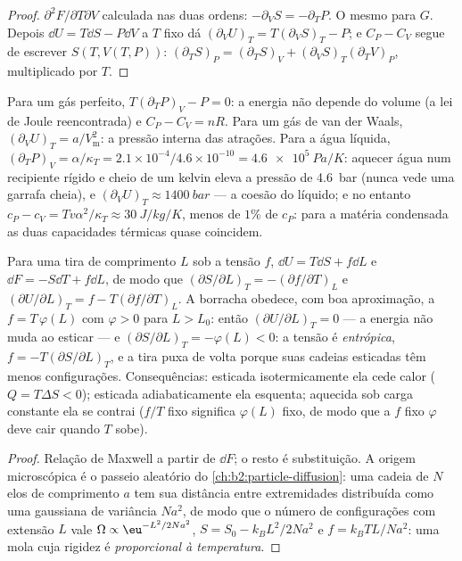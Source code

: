 \begin{proof}
$\partial^2F/\partial T\partial V$ calculada nas duas ordens: $-\partial_VS =
-\partial_TP$. O mesmo para $G$. Depois $\dd U = T\dd S - P\dd V$ a $T$ fixo
dá $(\partial_VU)_T = T(\partial_VS)_T - P$; e $C_P - C_V$ segue
de escrever $S(T,V(T,P))$: $(\partial_TS)_P = (\partial_TS)_V +
(\partial_VS)_T(\partial_TV)_P$, multiplicado por $T$.
\end{proof}

\begin{example}\label{ex:b2:thermodynamic-potentials:reveal}
Para um gás perfeito, $T(\partial_TP)_V - P = 0$: a energia não depende
do volume (a lei de Joule reencontrada) e $C_P - C_V = nR$. Para um gás de van
der Waals, $(\partial_VU)_T = a/V_{\text{m}}^2$: a pressão interna das
atrações. Para a água líquida, $(\partial_TP)_V = \alpha/\kappa_T = 2.1
\times 10^{-4}/4.6 \times 10^{-10} = \qty{4.6e5}{Pa/K}$: aquecer água num
recipiente rígido e cheio de um kelvin eleva a pressão de \qty{4.6}{bar}
(nunca vede uma garrafa cheia), e $(\partial_VU)_T \approx \qty{1400}{bar}$ ---
a coesão do líquido; e no entanto $c_P - c_V = Tv\alpha^2/\kappa_T \approx
\qty{30}{J/kg/K}$, menos de $1\%$ de $c_P$: para a matéria condensada as duas
capacidades térmicas quase coincidem.
\end{example}

\begin{proposition}\label{prop:b2:thermodynamic-potentials:rubber}
Para uma tira de comprimento $L$ sob a tensão $f$, $\dd U = T\dd S + f\dd L$
e $\dd F = -S\dd T + f\dd L$, de modo que $(\partial S/\partial L)_T =
-(\partial f/\partial T)_L$ e $(\partial U/\partial L)_T = f - T(\partial f/
\partial T)_L$. A borracha obedece, com boa aproximação, a $f = T\,\varphi(L)$
com $\varphi > 0$ para $L > L_0$: então $(\partial U/\partial L)_T = 0$ --- a
energia não muda ao esticar --- e $(\partial S/\partial L)_T =
-\varphi(L) < 0$: a tensão é \emph{entrópica}, $f = -T(\partial S/\partial
L)_T$, e a tira puxa de volta porque suas cadeias esticadas têm menos
configurações. Consequências: esticada isotermicamente ela cede calor
($Q = T\Delta S < 0$); esticada adiabaticamente ela esquenta; aquecida sob
carga constante ela se contrai ($f/T$ fixo significa $\varphi(L)$ fixo, de modo que a
$f$ fixo $\varphi$ deve cair quando $T$ sobe).
\end{proposition}

\begin{proof}
Relação de Maxwell a partir de $\dd F$; o resto é substituição. A
origem microscópica é o passeio aleatório do \cref{ch:b2:particle-diffusion}:
uma cadeia de $N$ elos de comprimento $a$ tem sua distância entre extremidades
distribuída como uma gaussiana de variância $Na^2$, de modo que o número de
configurações com extensão $L$ vale $\Omega \propto \eu^{-L^2/2Na^2}$, $S = S_0 -
k_BL^2/2Na^2$ e $f = k_BTL/Na^2$: uma mola cuja rigidez é
\emph{proporcional à temperatura}.
\end{proof}

